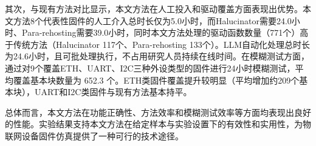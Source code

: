 其次，与现有方法对比显示，本文方法在人工投入和驱动覆盖方面表现出优势。本文方法8个代表性固件的人工介入总时长仅为5.0小时，而Halucinator需要24.0小时、Para-rehosting需要39.0小时，同时本文方法处理的驱动函数数量（771个）高于传统方法（Halucinator 117个、Para-rehosting 133个）。LLM自动化处理总时长为24.6小时，且可批处理执行，不占用研究人员持续在线时间。在模糊测试方面，通过对9个覆盖ETH、UART、I2C三种外设类型的固件进行24小时模糊测试，平均覆盖基本块数量为 652.3 个。ETH类固件覆盖提升较明显（平均增加约209个基本块），UART和I2C类固件与现有方法基本持平。

总体而言，本文方法在功能正确性、方法效率和模糊测试效率等方面均表现出良好的性能。实验结果支持本文方法在给定样本与实验设置下的有效性和实用性，为物联网设备固件仿真提供了一种可行的技术途径。
